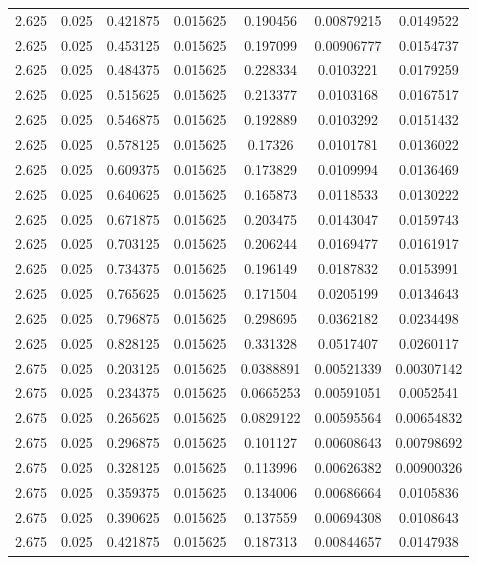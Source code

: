 \begin{table}[bh]
\begin{center}
{\begin{tabular}{ccccccc}
2.625	 & 0.025 & 	0.421875	 & 0.015625	 & 0.190456	 & 0.00879215	 & 0.0149522 \\ 
2.625	 & 0.025 & 	0.453125	 & 0.015625	 & 0.197099	 & 0.00906777	 & 0.0154737 \\ 
2.625	 & 0.025 & 	0.484375	 & 0.015625	 & 0.228334	 & 0.0103221	 & 0.0179259 \\ 
2.625	 & 0.025 & 	0.515625	 & 0.015625	 & 0.213377	 & 0.0103168	 & 0.0167517 \\ 
2.625	 & 0.025 & 	0.546875	 & 0.015625	 & 0.192889	 & 0.0103292	 & 0.0151432 \\ 
2.625	 & 0.025 & 	0.578125	 & 0.015625	 & 0.17326	 & 0.0101781	 & 0.0136022 \\ 
2.625	 & 0.025 & 	0.609375	 & 0.015625	 & 0.173829	 & 0.0109994	 & 0.0136469 \\ 
2.625	 & 0.025 & 	0.640625	 & 0.015625	 & 0.165873	 & 0.0118533	 & 0.0130222 \\ 
2.625	 & 0.025 & 	0.671875	 & 0.015625	 & 0.203475	 & 0.0143047	 & 0.0159743 \\ 
2.625	 & 0.025 & 	0.703125	 & 0.015625	 & 0.206244	 & 0.0169477	 & 0.0161917 \\ 
2.625	 & 0.025 & 	0.734375	 & 0.015625	 & 0.196149	 & 0.0187832	 & 0.0153991 \\ 
2.625	 & 0.025 & 	0.765625	 & 0.015625	 & 0.171504	 & 0.0205199	 & 0.0134643 \\ 
2.625	 & 0.025 & 	0.796875	 & 0.015625	 & 0.298695	 & 0.0362182	 & 0.0234498 \\ 
2.625	 & 0.025 & 	0.828125	 & 0.015625	 & 0.331328	 & 0.0517407	 & 0.0260117 \\ 
2.675	 & 0.025 & 	0.203125	 & 0.015625	 & 0.0388891	 & 0.00521339	 & 0.00307142 \\ 
2.675	 & 0.025 & 	0.234375	 & 0.015625	 & 0.0665253	 & 0.00591051	 & 0.0052541 \\ 
2.675	 & 0.025 & 	0.265625	 & 0.015625	 & 0.0829122	 & 0.00595564	 & 0.00654832 \\ 
2.675	 & 0.025 & 	0.296875	 & 0.015625	 & 0.101127	 & 0.00608643	 & 0.00798692 \\ 
2.675	 & 0.025 & 	0.328125	 & 0.015625	 & 0.113996	 & 0.00626382	 & 0.00900326 \\ 
2.675	 & 0.025 & 	0.359375	 & 0.015625	 & 0.134006	 & 0.00686664	 & 0.0105836 \\ 
2.675	 & 0.025 & 	0.390625	 & 0.015625	 & 0.137559	 & 0.00694308	 & 0.0108643 \\ 
2.675	 & 0.025 & 	0.421875	 & 0.015625	 & 0.187313	 & 0.00844657	 & 0.0147938 \\ 

\end{tabular}}
\end{center}
\end{table}
